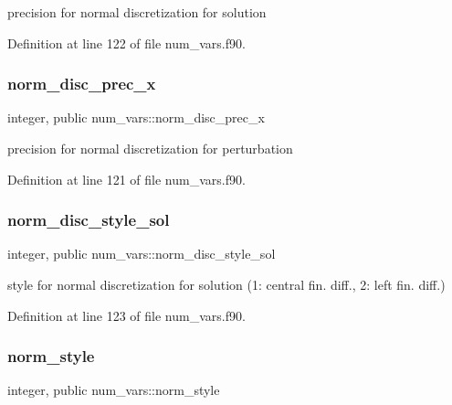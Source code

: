 precision for normal discretization for solution 



Definition at line 122 of file num\+\_\+vars.\+f90.

\mbox{\label{namespacenum__vars_acba4a05e477f116855028f2057ce4e49}} 
\subsubsection{\texorpdfstring{norm\+\_\+disc\+\_\+prec\+\_\+x}{norm\_disc\_prec\_x}}
{\footnotesize\ttfamily integer, public num\+\_\+vars\+::norm\+\_\+disc\+\_\+prec\+\_\+x}



precision for normal discretization for perturbation 



Definition at line 121 of file num\+\_\+vars.\+f90.

\mbox{\label{namespacenum__vars_a5afcab5bc4c55fdb6a816bf7261160e2}} 
\subsubsection{\texorpdfstring{norm\+\_\+disc\+\_\+style\+\_\+sol}{norm\_disc\_style\_sol}}
{\footnotesize\ttfamily integer, public num\+\_\+vars\+::norm\+\_\+disc\+\_\+style\+\_\+sol}



style for normal discretization for solution (1\+: central fin. diff., 2\+: left fin. diff.) 



Definition at line 123 of file num\+\_\+vars.\+f90.

\mbox{\label{namespacenum__vars_acefc971404bce11e23308d5214d96d32}} 
\subsubsection{\texorpdfstring{norm\+\_\+style}{norm\_style}}
{\footnotesize\ttfamily integer, public num\+\_\+vars\+::norm\+\_\+style}



